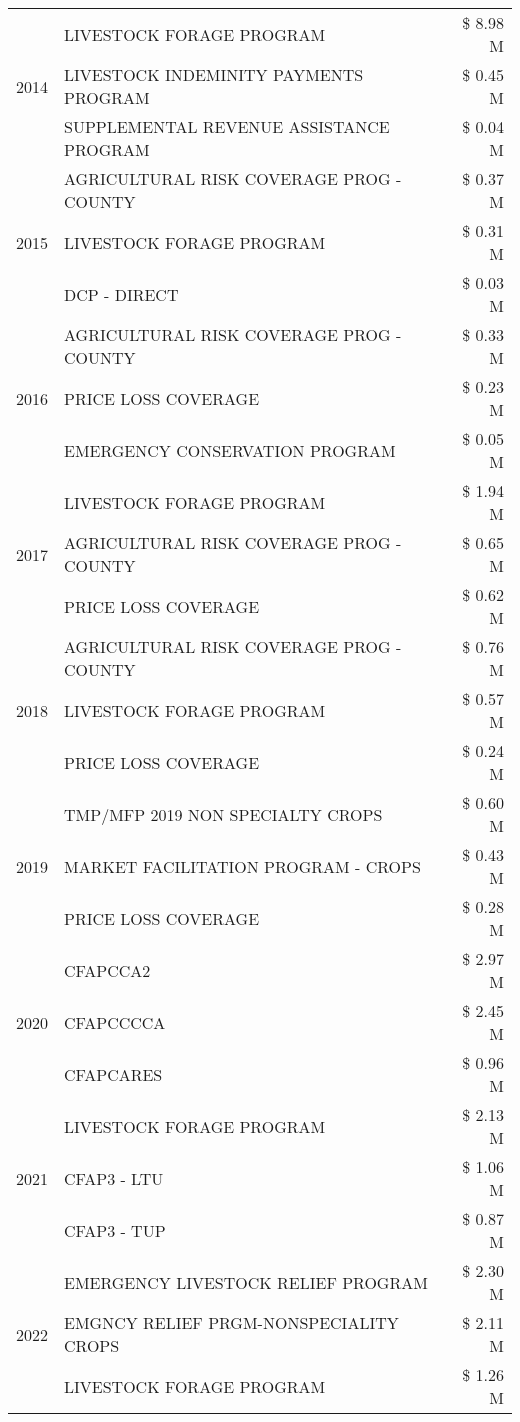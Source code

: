 \begin{tabular}{llr}
\cline{1-3}
\multirow[t]{3}{*}{2014} & LIVESTOCK FORAGE PROGRAM & \$ 8.98 M \\
 & LIVESTOCK INDEMINITY PAYMENTS PROGRAM & \$ 0.45 M \\
 & SUPPLEMENTAL REVENUE ASSISTANCE PROGRAM & \$ 0.04 M \\
\cline{1-3}
\multirow[t]{3}{*}{2015} & AGRICULTURAL RISK COVERAGE PROG - COUNTY & \$ 0.37 M \\
 & LIVESTOCK FORAGE PROGRAM & \$ 0.31 M \\
 & DCP - DIRECT & \$ 0.03 M \\
\cline{1-3}
\multirow[t]{3}{*}{2016} & AGRICULTURAL RISK COVERAGE PROG - COUNTY & \$ 0.33 M \\
 & PRICE LOSS COVERAGE & \$ 0.23 M \\
 & EMERGENCY CONSERVATION PROGRAM & \$ 0.05 M \\
\cline{1-3}
\multirow[t]{3}{*}{2017} & LIVESTOCK FORAGE PROGRAM & \$ 1.94 M \\
 & AGRICULTURAL RISK COVERAGE PROG - COUNTY & \$ 0.65 M \\
 & PRICE LOSS COVERAGE & \$ 0.62 M \\
\cline{1-3}
\multirow[t]{3}{*}{2018} & AGRICULTURAL RISK COVERAGE PROG - COUNTY & \$ 0.76 M \\
 & LIVESTOCK FORAGE PROGRAM & \$ 0.57 M \\
 & PRICE LOSS COVERAGE & \$ 0.24 M \\
\cline{1-3}
\multirow[t]{3}{*}{2019} & TMP/MFP 2019 NON SPECIALTY CROPS & \$ 0.60 M \\
 & MARKET FACILITATION PROGRAM - CROPS & \$ 0.43 M \\
 & PRICE LOSS COVERAGE & \$ 0.28 M \\
\cline{1-3}
\multirow[t]{3}{*}{2020} & CFAPCCA2 & \$ 2.97 M \\
 & CFAPCCCCA & \$ 2.45 M \\
 & CFAPCARES & \$ 0.96 M \\
\cline{1-3}
\multirow[t]{3}{*}{2021} & LIVESTOCK FORAGE PROGRAM & \$ 2.13 M \\
 & CFAP3 - LTU & \$ 1.06 M \\
 & CFAP3 - TUP & \$ 0.87 M \\
\cline{1-3}
\multirow[t]{3}{*}{2022} & EMERGENCY LIVESTOCK RELIEF PROGRAM & \$ 2.30 M \\
 & EMGNCY RELIEF PRGM-NONSPECIALITY CROPS & \$ 2.11 M \\
 & LIVESTOCK FORAGE PROGRAM & \$ 1.26 M \\
\cline{1-3}
\bottomrule
\end{tabular}
